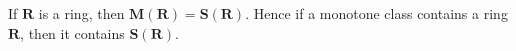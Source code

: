 If $\mathbf{R}$ is a ring, then $\mathbf{M}(\mathbf{R}) = \mathbf{S}(\mathbf{R})$. Hence if a monotone class contains a ring $\mathbf{R}$, then it contains $\mathbf{S}(\mathbf{R})$.
